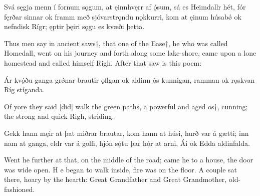 Svá sęgja menn í fornum sǫgum, at ęinnhvęrr af ǫ́sum, sá es Heimdallr hét, fór fęrðar sinnar ok framm með sjóvarstrǫndu nǫkkurri, kom at ęinum húsabǿ ok nefndisk Rígr; ęptir þęiri sǫgu es kvæði þetta.

Thus men say in ancient saws†, that one of the Ease†, he who was called Homedall, went on his journey and forth along some lake-shore, came upon a lone homestead and called himself Righ. After that saw is this poem:

Ár kvǫ́ðu ganga \hld grǿnar brautir
ǫflgan ok aldinn \hld ǫ́s kunnigan,
ramman ok rǫskvan \hld Ríg stíganda. 

Of yore they said [did] walk the green paths, a powerful and aged os†, cunning; the strong and quick Righ, striding.

Gekk hann męir at þat \hld miðrar brautar,
kom hann at húsi, \hld hurð var á gætti;
inn nam at ganga, \hld eldr var á golfi,
hjón sǫ́tu þar \hld hǫ́r at arni,
Ái ok Edda \hld aldinfalda. 

Went he further at that, on the middle of the road; came he to a house, the door was wide open. H e began to walk inside, fire was on the floor. A couple sat there, hoary by the hearth: Great Grandfather and Great Grandmother, old-fashioned.
